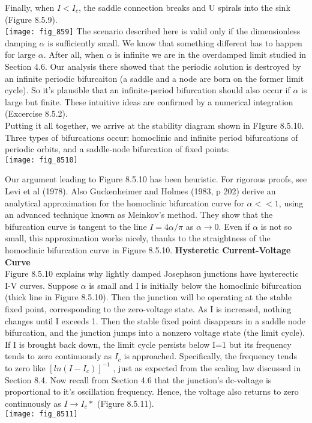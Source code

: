 \documentclass{article}
\newcommand\tab[1][1cm]{\hspace*{#1}}
\begin{document}
Finally, when $I<I_{c}$, the saddle connection breaks and U spirals into the sink (Figure 8.5.9). \\
\texttt{[image: fig\_859]} 
The scenario described here is valid only if the dimensionless damping $\alpha$ is sufficiently small. We know that something different has to happen for large $\alpha$. After all, when $\alpha$ is infinite we are in the overdamped limit studied in Section 4.6. Our analysis there showed that the periodic solution is destroyed by an infinite periodic bifurcaiton (a saddle and a node are born on the former limit cycle). So it's plausible that an infinite-period bifurcation should also occur if $\alpha$ is large but finite. These intuitive ideas are confirmed by a numerical integration (Excercise 8.5.2). \\
Putting it all together, we arrive at the stability diagram shown in FIgure 8.5.10. Three types of bifurcations occur: homoclinic and infinite period bifurcations of periodic orbits, and a saddle-node bifurcation of fixed points. \\
\texttt{[image: fig\_8510]}

Our argument leading to Figure 8.5.10 has been heuristic. For rigorous proofs, see Levi et al (1978). Also Guckenheimer and Holmes (1983, p 202) derive an analytical approximation for the homoclinic bifurcation curve for $\alpha << 1$, using an advanced technique known as Meinkov's method. They show that the bifurcation curve is tangent to the line $I=4\alpha / \pi$ as $\alpha \to 0$. Even if $\alpha$ is not so small, this approximation works nicely, thanks to the straightness of the homoclinic bifurcation curve in Figure 8.5.10.
\textbf {Hysteretic Current-Voltage Curve}
\\ \tab
Figure 8.5.10 explains why lightly damped Josephson junctions have hysterectic I-V curves. Suppose $\alpha$ is small and I is initially below the homoclinic bifurcation (thick line in Figure 8.5.10). Then the junction will be operating at the stable fixed point, corresponding to the zero-voltage state. As I is increased, nothing changes until I exceeds 1. Then the stable fixed point disappears in a saddle node bifurcation, and the junction jumps into a nonzero voltage state (the limit cycle). \\ \tab
If I is brought back down, the limit cycle persists below I=1 but its frequency tends to zero continuously as $I_{c}$ is approached. Specifically, the frequency tends to zero like $[ln(I-I_{c})]^{-1}$ , just as expected from the scaling law discussed in Section 8.4. Now recall from Section 4.6 that the junction's dc-voltage is proportional to it's oscillation frequency. Hence, the voltage also returns to zero continuously as $I \to I_{c}*$ (Figure 8.5.11). \\
\texttt{[image: fig\_8511]}
\end{document}
